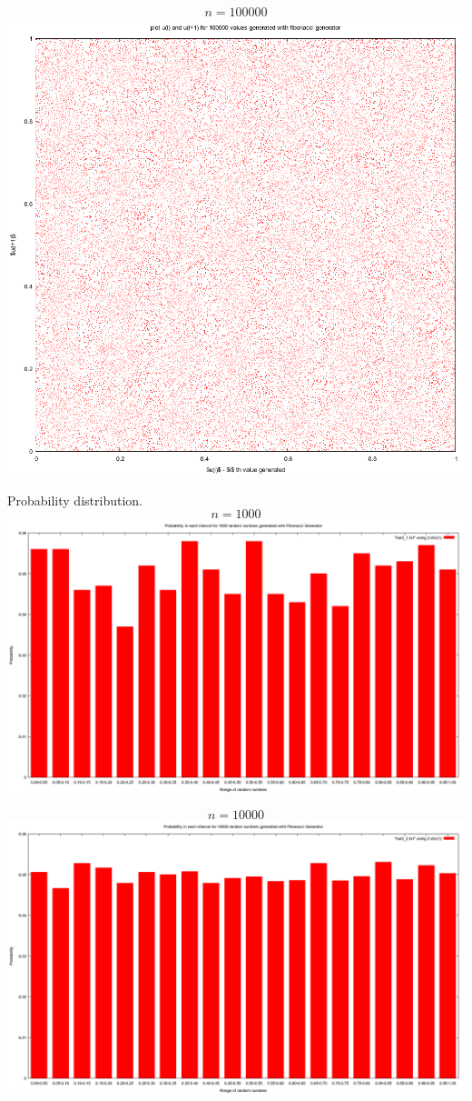 \documentclass{article}
\begin{document}
$$n = 100000$$
\includegraphics[scale=0.45]{"dataplot2c"}
\pagebreak


Probability distribution.\\
$$n = 1000$$
\includegraphics[scale=0.3]{"bar2_1"}

$$n = 10000$$
\includegraphics[scale=0.3]{"bar2_2"}
\end{document}
